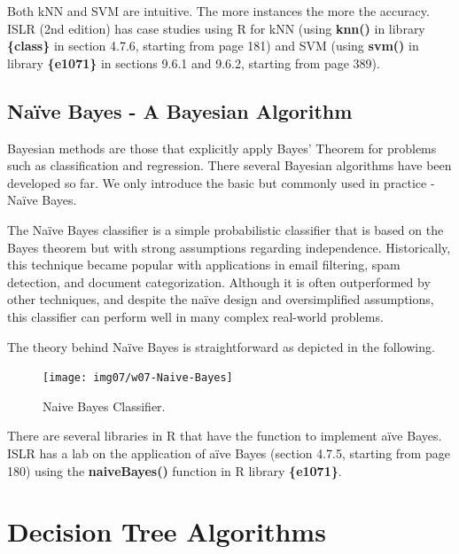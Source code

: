 \documentclass[
]{book}
\begin{document}
Both kNN and SVM are intuitive. The more instances the more the accuracy. ISLR (2nd edition) has case studies using R for kNN (using \textbf{knn()} in library \textbf{\{class\}} in section 4.7.6, starting from page 181) and SVM (using \textbf{svm()} in library \textbf{\{e1071\}} in sections 9.6.1 and 9.6.2, starting from page 389).

\hfill\break

\hypertarget{nauxefve-bayes---a-bayesian-algorithm}{%
\subsection{Naïve Bayes - A Bayesian Algorithm}\label{nauxefve-bayes---a-bayesian-algorithm}}

Bayesian methods are those that explicitly apply Bayes' Theorem for problems such as classification and regression. There several Bayesian algorithms have been developed so far. We only introduce the basic but commonly used in practice - Naïve Bayes.

The Naïve Bayes classifier is a simple probabilistic classifier that is based on the Bayes theorem but with strong assumptions regarding independence. Historically, this technique became popular with applications in email filtering, spam detection, and document categorization. Although it is often outperformed by other techniques, and despite the naïve design and oversimplified assumptions, this classifier can perform well in many complex real-world problems.

The theory behind Naïve Bayes is straightforward as depicted in the following.

\begin{figure}

{\centering \texttt{[image: img07/w07-Naive-Bayes]} 

}

\caption{Naive Bayes Classifier.}\label{fig:unnamed-chunk-166}
\end{figure}

There are several libraries in R that have the function to implement aïve Bayes. ISLR has a lab on the application of aïve Bayes (section 4.7.5, starting from page 180) using the \textbf{naiveBayes()} function in R library \textbf{\{e1071\}}.

\hfill\break

\hypertarget{decision-tree-algorithms}{%
\section{Decision Tree Algorithms}\label{decision-tree-algorithms}}
\end{document}
